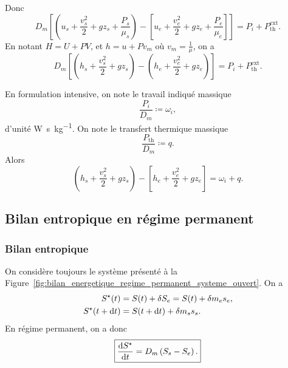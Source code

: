             Donc
            \begin{equation*}
                D_m\left[\left(u_s+\frac{v_s^{2}}{2}+g z_s+\frac{P_s}{\mu_s}\right)-\left[u_e+\frac{v_e^{2}}{2}+g z_e+\frac{P_e}{\mu_e}\right]\right]=P_i+P_{\text{th}}^{\text{ext}}.
            \end{equation*}
            En notant $H=U+PV$, et $h=u+Pv_m$ où $v_m=\frac{1}{\mu}$, on a
            \begin{equation*}
                \boxed{
                    D_m\left[\left(h_s+\frac{v_s^{2}}{2}+g z_s\right)-\left(h_e+\frac{v_e^{2}}{2}+g z_e\right)\right]=P_i+P_{\text{th}}^{\text{ext}}.
                }
            \end{equation*}

            En formulation intensive, on note le travail indiqué massique
            \begin{equation*}
                \boxed{
                    \frac{P_i}{D_m}\coloneqq\omega_i,
                }
            \end{equation*}
            d'unité \si[]{\watt\second\per\kilogram}. On note le transfert thermique massique 
            \begin{equation*}
                \boxed{
                    \frac{P_{\text{th}}}{D_m}\coloneqq q.
                }
            \end{equation*}
            Alors
            \begin{equation*}
                \left(h_s+\frac{v_s^{2}}{2}+g z_s\right)-\left[h_e+\frac{v_e^{2}}{2}+g z_e\right]=\omega_i+q.
            \end{equation*}

    \subsection{Bilan entropique en régime permanent}
        
        \subsubsection{Bilan entropique}
            
            On considère toujours le système présenté à la Figure~\ref{fig:bilan_energetique_regime_permanent_systeme_ouvert}. On a 
            \begin{equation*}
                \begin{aligned}
                    S^{\star}(t)&= S(t)+\delta S_e=S(t)+\delta m_e s_e,\\
                    S^{\star}(t+\mathrm{d} t)&= S(t+\mathrm{d} t)+\delta m_s s_s.
                \end{aligned}
            \end{equation*}
            En régime permanent, on a donc
            \begin{equation*}
                \boxed{
                    \frac{\mathrm{d} S^{\star}}{\mathrm{d} t}=D_m\left(S_s-S_e\right).
                }
            \end{equation*}

